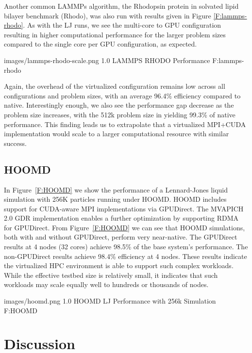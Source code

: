 \documentclass{sigplanconf}
\begin{document}
Another common LAMMPs algorithm, the Rhodopsin protein in solvated lipid bilayer benchmark (Rhodo), was also run with results given in Figure \ref{F:lammps-rhodo}. As with the LJ runs, we see the multi-core to GPU configuration resulting in higher computational performance for the larger problem sizes compared to the single core per GPU configuration, as expected.  

  {images/lammps-rhodo-scale.png}
  {1.0}
  {LAMMPS RHODO Performance}
  {F:lammps-rhodo}

Again, the overhead of the virtualized configuration remains low across all configurations and problem sizes, with an average 96.4\% efficiency compared to native. Interestingly enough, we also see the performance gap decrease as the problem size increases, with the 512k problem size in yielding 99.3\% of native performance.  This finding leads us to extrapolate that a virtualized MPI+CUDA implementation would scale to a larger computational resource with similar success. 


\subsection{HOOMD}






In Figure~\ref{F:HOOMD} we show the performance of a Lennard-Jones liquid simulation with 256K particles running under HOOMD.  HOOMD includes support for CUDA-aware MPI implementations via GPUDirect.  The MVAPICH 2.0 GDR implementation enables a further optimization by supporting RDMA for GPUDirect. From Figure~\ref{F:HOOMD} we can see that HOOMD simulations, both with and without GPUDirect, perform very near-native.  The GPUDirect results at 4 nodes (32 cores) achieve 98.5\% of the base system's performance.  The non-GPUDirect results achieve 98.4\% efficiency at 4 nodes. These results indicate the virtualized HPC environment is able to support such complex workloads. While the effective testbed size is relatively small, it indicates that such workloads may scale equally well to hundreds or thousands of nodes. 

  {images/hoomd.png}
  {1.0}
  {HOOMD LJ Performance with 256k Simulation}
  {F:HOOMD}


\section{Discussion}
\end{document}
